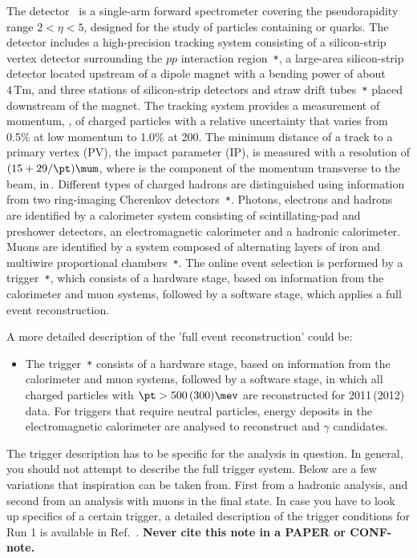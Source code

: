 The \lhcb detector~\cite{Alves:2008zz,LHCb-DP-2014-002} is a single-arm forward
spectrometer covering the \mbox{pseudorapidity} range $2<\eta <5$,
designed for the study of particles containing \bquark or \cquark
quarks. The detector includes a high-precision tracking system
consisting of a silicon-strip vertex detector surrounding the $pp$
interaction region~\cite{LHCb-DP-2014-001}\verb!*!, a large-area silicon-strip detector located
upstream of a dipole magnet with a bending power of about
$4{\mathrm{\,Tm}}$, and three stations of silicon-strip detectors and straw
drift tubes~\cite{LHCb-DP-2013-003}\verb!*! placed downstream of the magnet.
The tracking system provides a measurement of momentum, \ptot, of charged particles with
a relative uncertainty that varies from 0.5\% at low momentum to 1.0\% at 200\gevc.
The minimum distance of a track to a primary vertex (PV), the impact parameter (IP), 
is measured with a resolution of $(15+29/\pt)\mum$,
where \pt is the component of the momentum transverse to the beam, in\,\gevc.
Different types of charged hadrons are distinguished using information
from two ring-imaging Cherenkov detectors~\cite{LHCb-DP-2012-003}\verb!*!. 
Photons, electrons and hadrons are identified by a calorimeter system consisting of
scintillating-pad and preshower detectors, an electromagnetic
calorimeter and a hadronic calorimeter. Muons are identified by a
system composed of alternating layers of iron and multiwire
proportional chambers~\cite{LHCb-DP-2012-002}\verb!*!.
The online event selection is performed by a trigger~\cite{LHCb-DP-2012-004}\verb!*!, 
which consists of a hardware stage, based on information from the calorimeter and muon
systems, followed by a software stage, which applies a full event
reconstruction.

A more detailed description of the 'full event reconstruction' could be:
\begin{itemize}
\item The trigger~\cite{LHCb-DP-2012-004}\verb!*! consists of a
hardware stage, based on information from the calorimeter and muon
systems, followed by a software stage, in which all charged particles
with $\pt>500\,(300)\mev$ are reconstructed for 2011\,(2012) data.
For triggers that require neutral particles, 
energy deposits in the electromagnetic calorimeter are 
analysed to reconstruct \piz and $\gamma$ candidates.
\end{itemize}

The trigger description has to be specific for the analysis in
question. In general, you should not attempt to describe the full
trigger system. Below are a few variations that inspiration can be
taken from. First from a hadronic analysis, and second from an
analysis with muons in the final state. In case you have to look 
up specifics of a certain trigger, a detailed description of the trigger 
conditions for Run 1 is available in Ref.~\cite{LHCb-PUB-2014-046}. 
{\bf Never cite this note in a PAPER or CONF-note.} 


